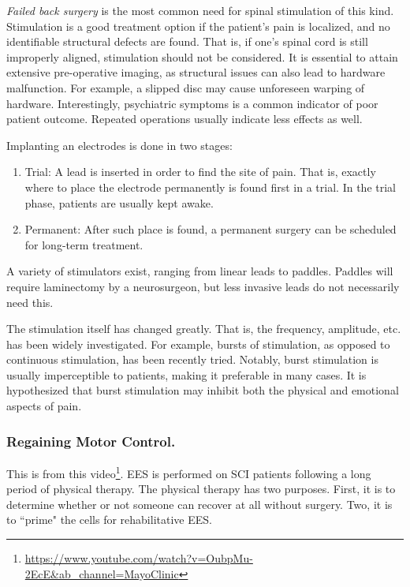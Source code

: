 \textit{Failed back surgery} is the most common need for spinal stimulation of this kind. Stimulation is a good treatment option if the patient's pain is localized, and no identifiable structural defects are found. That is, if one's spinal cord is still improperly aligned, stimulation should not be considered. It is essential to attain extensive pre-operative imaging, as structural issues can also lead to hardware malfunction. For example, a slipped disc may cause unforeseen warping of hardware. Interestingly, psychiatric symptoms is a common indicator of poor patient outcome. Repeated operations usually indicate less effects as well.\newline

Implanting an electrodes is done in two stages:
\begin{enumerate}
    \item Trial: A lead is inserted in order to find the site of pain. That is, exactly where to place the electrode permanently is found first in a trial. In the trial phase, patients are usually kept awake. 
    \item Permanent: After such place is found, a permanent surgery can be scheduled for long-term treatment. 
\end{enumerate}

A variety of stimulators exist, ranging from linear leads to paddles. Paddles will require laminectomy by a neurosurgeon, but less invasive leads do not necessarily need this.\newline

The stimulation itself has changed greatly. That is, the frequency, amplitude, etc. has been widely investigated. For example, bursts of stimulation, as opposed to continuous stimulation, has been recently tried. Notably, burst stimulation is usually imperceptible to patients, making it preferable in many cases. It is hypothesized that burst stimulation may inhibit both the physical and emotional aspects of pain. 

\subsubsection{Regaining Motor Control.}

This is from this video\footnote{\url{https://www.youtube.com/watch?v=OubpMu-2EcE\&ab_channel=MayoClinic}}. EES is performed on SCI patients following a long period of physical therapy. The physical therapy has two purposes. First, it is to determine whether or not someone can recover at all without surgery. Two, it is to ``prime" the cells for rehabilitative EES.\newline

